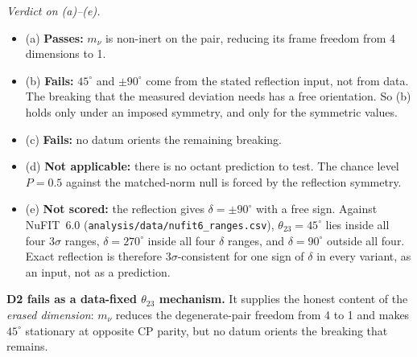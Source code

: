 \emph{Verdict on (a)--(e).}
\begin{itemize}
\item (a) \textbf{Passes:} $m_\nu$ is non-inert on the pair, reducing its frame freedom from 4
  dimensions to 1.
\item (b) \textbf{Fails:} $45^\circ$ and $\pm90^\circ$ come from the stated reflection input, not
  from data. The breaking that the measured deviation needs has a free orientation. So (b) holds
  only under an imposed symmetry, and only for the symmetric values.
\item (c) \textbf{Fails:} no datum orients the remaining breaking.
\item (d) \textbf{Not applicable:} there is no octant prediction to test. The chance level
  $P=0.5$ against the matched-norm null is forced by the reflection symmetry.
\item (e) \textbf{Not scored:} the reflection gives $\delta=\pm90^\circ$ with a free sign. Against
  NuFIT~6.0 (\texttt{analysis/data/nufit6\_ranges.csv}), $\theta_{23}=45^\circ$ lies inside all four
  $3\sigma$ ranges, $\delta=270^\circ$ inside all four $\delta$ ranges, and $\delta=90^\circ$ outside
  all four. Exact reflection is therefore $3\sigma$-consistent for one sign of $\delta$ in every
  variant, as an input, not as a prediction.
\end{itemize}
\textbf{D2 fails as a data-fixed $\theta_{23}$ mechanism.} It supplies the honest content of the
\emph{erased dimension}: $m_\nu$ reduces the degenerate-pair freedom from 4 to 1 and makes $45^\circ$
stationary at opposite CP parity, but no datum orients the breaking that remains.

